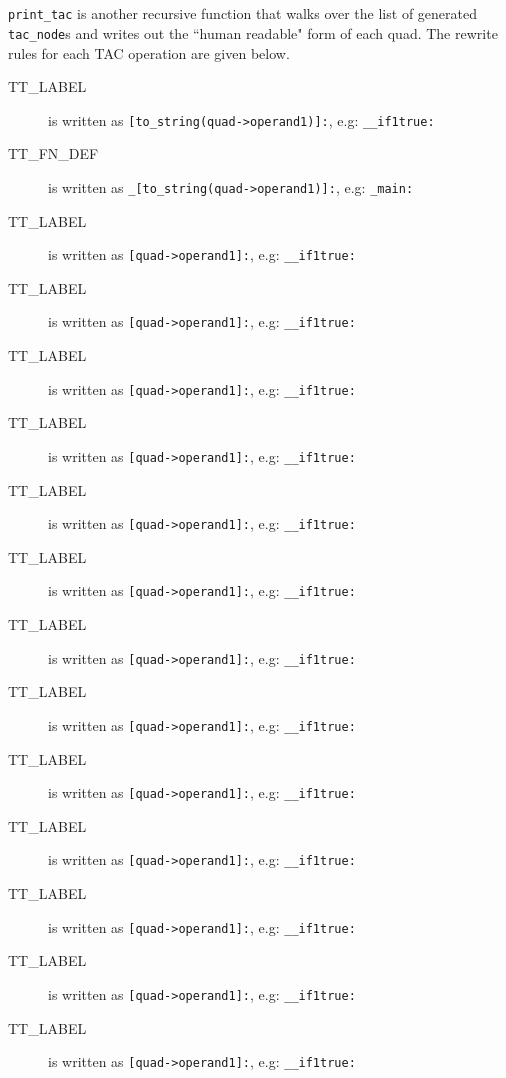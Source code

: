 \ \\ \ \\
\verb!print_tac! is another recursive function that walks over the list of generated \verb!tac_node!s and writes out the ``human readable" form of each quad. The rewrite rules for each TAC operation are given below.
\begin{description}
	\item[TT\_LABEL] is written as \verb![to_string(quad->operand1)]:!, e.g: \verb!__if1true:!
	\item[TT\_FN\_DEF] is written as \verb!_[to_string(quad->operand1)]:!, e.g: \verb!_main:!
	\item[TT\_LABEL] is written as \verb![quad->operand1]:!, e.g: \verb!__if1true:!
	\item[TT\_LABEL] is written as \verb![quad->operand1]:!, e.g: \verb!__if1true:!
	\item[TT\_LABEL] is written as \verb![quad->operand1]:!, e.g: \verb!__if1true:!		
	\item[TT\_LABEL] is written as \verb![quad->operand1]:!, e.g: \verb!__if1true:!
	\item[TT\_LABEL] is written as \verb![quad->operand1]:!, e.g: \verb!__if1true:!
	\item[TT\_LABEL] is written as \verb![quad->operand1]:!, e.g: \verb!__if1true:!
	\item[TT\_LABEL] is written as \verb![quad->operand1]:!, e.g: \verb!__if1true:!
	\item[TT\_LABEL] is written as \verb![quad->operand1]:!, e.g: \verb!__if1true:!
	\item[TT\_LABEL] is written as \verb![quad->operand1]:!, e.g: \verb!__if1true:!
	\item[TT\_LABEL] is written as \verb![quad->operand1]:!, e.g: \verb!__if1true:!
	\item[TT\_LABEL] is written as \verb![quad->operand1]:!, e.g: \verb!__if1true:!
	\item[TT\_LABEL] is written as \verb![quad->operand1]:!, e.g: \verb!__if1true:!
	\item[TT\_LABEL] is written as \verb![quad->operand1]:!, e.g: \verb!__if1true:!
\end{description}

